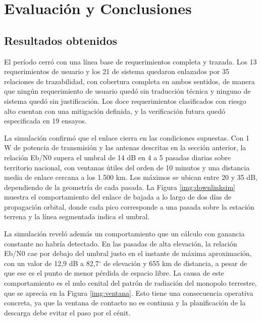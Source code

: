 \section{Evaluación y Conclusiones}

\subsection{Resultados obtenidos}

El período cerró con una línea base de requerimientos completa y trazada. Los 13 requerimientos de usuario y los 21 de sistema quedaron enlazados por 35 relaciones de trazabilidad, con cobertura completa en ambos sentidos, de manera que ningún requerimiento de usuario quedó sin traducción técnica y ninguno de sistema quedó sin justificación. Los doce requerimientos clasificados con riesgo alto cuentan con una mitigación definida, y la verificación futura quedó especificada en 19 ensayos.

La simulación confirmó que el enlace cierra en las condiciones supuestas. Con 1 W de potencia de transmisión y las antenas descritas en la sección anterior, la relación Eb/N0 supera el umbral de 14 dB en 4 a 5 pasadas diarias sobre territorio nacional, con ventanas útiles del orden de 10 minutos y una distancia media de enlace cercana a los 1.500 km. Los máximos se ubican entre 20 y 35 dB, dependiendo de la geometría de cada pasada. La Figura \ref{img:downlinksim} muestra el comportamiento del enlace de bajada a lo largo de dos días de propagación orbital, donde cada pico corresponde a una pasada sobre la estación terrena y la línea segmentada indica el umbral.

La simulación reveló además un comportamiento que un cálculo con ganancia constante no habría detectado. En las pasadas de alta elevación, la relación Eb/N0 cae por debajo del umbral justo en el instante de máxima aproximación, con un valor de 12,9 dB a 82,7$^{\circ}$ de elevación y 655 km de distancia, a pesar de que ese es el punto de menor pérdida de espacio libre. La causa de este comportamiento es el nulo cenital del patrón de radiación del monopolo terrestre, que se aprecia en la Figura \ref{img:ventana}. Esto tiene una consecuencia operativa concreta, ya que la ventana de contacto no es continua y la planificación de la descarga debe evitar el paso por el cénit.

